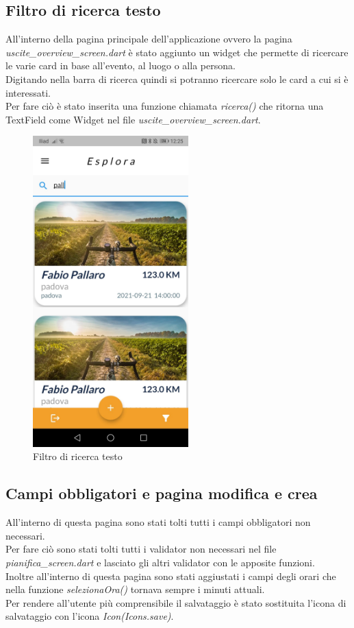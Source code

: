 \newpage

\subsection{Filtro di ricerca testo}
All'interno della pagina principale dell'applicazione ovvero la pagina \textit{uscite\_overview\_screen.dart} è stato aggiunto un widget che permette di ricercare le varie card in base all'evento, al luogo o alla persona.\\
Digitando nella barra di ricerca quindi si potranno ricercare solo le card a cui si è interessati.\\
Per fare ciò è stato inserita una funzione chiamata \textit{ricerca()} che ritorna una TextField come Widget nel file \textit{uscite\_overview\_screen.dart}.\\

\begin{figure}[htbp]	
	\centering
	\includegraphics[width=6cm]{immagini/filtrotesto.jpeg}
	\caption{Filtro di ricerca testo}
	\label{fig:Filtro di ricerca testo}
\end{figure}

\newpage

\subsection{Campi obbligatori e pagina modifica e crea}
All'interno di questa pagina sono stati tolti tutti i campi obbligatori non necessari.\\
Per fare ciò sono stati tolti tutti i validator non necessari nel file \textit{pianifica\_screen.dart} e lasciato gli altri validator con le apposite funzioni.\\
Inoltre all'interno di questa pagina sono stati aggiustati i campi degli orari che nella funzione \textit{selezionaOra()} tornava sempre i minuti attuali.\\
Per rendere all'utente più comprensibile il salvataggio è stato sostituita l'icona di salvataggio con l'icona \textit{Icon(Icons.save)}.\\

